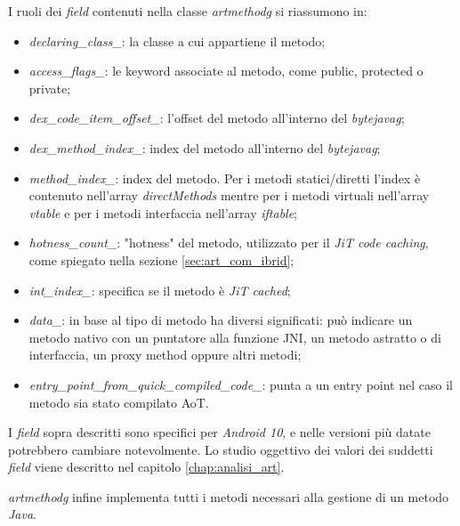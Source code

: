 I ruoli dei \emph{field} contenuti nella classe \emph{\gls{artmethodg}} si riassumono in:

\begin{itemize}
    \item \emph{declaring\_class\_}: la classe a cui appartiene il metodo;
    \item \emph{access\_flags\_}: le keyword associate al metodo, come public, protected o private;
    \item \emph{dex\_code\_item\_offset\_}: l'offset del metodo all'interno del \emph{\gls{bytejavag}};
    \item \emph{dex\_method\_index\_}: index del metodo all'interno del \emph{\gls{bytejavag}};
    \item \emph{method\_index\_}: index del metodo. Per i metodi statici/diretti l'index è contenuto nell'array \emph{directMethods} mentre per i metodi virtuali nell'array \emph{vtable} e per i metodi interfaccia nell'array \emph{iftable};
    \item \emph{hotness\_count\_}: "hotness" del metodo, utilizzato per il \emph{JiT code caching}, come spiegato nella sezione \ref{sec:art_com_ibrid};
    \item \emph{int\_index\_}: specifica se il metodo è \emph{JiT cached};
    \item \emph{data\_}: in base al tipo di metodo ha diversi significati: può indicare un metodo nativo con un puntatore alla funzione JNI, un metodo astratto o di interfaccia, un proxy method oppure altri metodi;
    \item \emph{entry\_point\_from\_quick\_compiled\_code\_}: punta a un entry point nel caso il metodo sia stato compilato AoT.
\end{itemize}

I \emph{field} sopra descritti sono specifici per \emph{Android 10}, e nelle versioni più datate potrebbero cambiare notevolmente. Lo studio oggettivo dei valori dei suddetti \emph{field} viene descritto nel capitolo \ref{chap:analisi_art}.

\emph{\gls{artmethodg}} infine implementa tutti i metodi necessari alla gestione di un metodo \emph{Java}.

